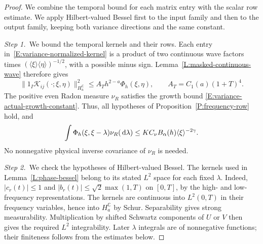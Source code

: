 \begin{proof}
  We combine the temporal bound for each matrix entry with the scalar row
  estimate. We apply Hilbert-valued Bessel first to the input family and then
  to the output family, keeping both variance directions and the same
  constant.

  \medskip
  \noindent\textit{Step 1.~}We bound the temporal kernels and their rows.
  Each entry in~\eqref{E:variance-normalized-kernel} is a product of two
  continuous wave factors times $(\langle\xi\rangle\langle\eta\rangle)^{-1/2}$,
  with a possible minus sign. Lemma~\ref{L:masked-continuous-wave} therefore
  gives
  \begin{equation}\label{E:variance-kernel-time-bound}
    \|1_I\mathcal{K}_{ij}(\cdot;\xi,\eta)\|_{H_a^{\mathbb{C}}}^2
    \le A_T h^{2-a}\Phi_h(\xi,\eta),
    \qquad A_T = C_1(a)(1+T)^4.
  \end{equation}
  The positive even Radon measure $\nu_R$ satisfies the growth bound
  \eqref{E:variance-actual-growth-constant}. Thus, all hypotheses of
  Proposition~\ref{P:frequency-row} hold, and
  \begin{equation}\label{E:variance-actual-row-bound}
    \int\Phi_h(\xi,\xi-\lambda)\nu_R(\,\mathrm{d}\lambda)
    \le K C_\nu B_\alpha(h)\langle\xi\rangle^{-2\gamma}.
  \end{equation}
  No nonnegative physical inverse covariance of $\nu_R$ is needed.

  \medskip
  \noindent\textit{Step 2.~}We check the hypotheses of Hilbert-valued Bessel.
  The kernels used in Lemma~\ref{L:phase-bessel} belong to its stated $L^2$
  space for each fixed $\lambda$. Indeed, $|c_r(t)| \le 1$ and $|b_r(t)| \le
  \sqrt{2}\max(1,T)$ on $[0,T]$, by the high- and low-frequency representations.
  The kernels are continuous into $L^2(0,T)$ in their frequency variables, hence
  into $H_a^{\mathbb{C}}$ by Schur. Separability gives strong measurability.
  Multiplication by shifted Schwartz components of $U$ or $V$ then gives the
  required $L^2$ integrability. Later $\lambda$ integrals are of nonnegative
  functions; their finiteness follows from the estimates below.



\end{proof}
